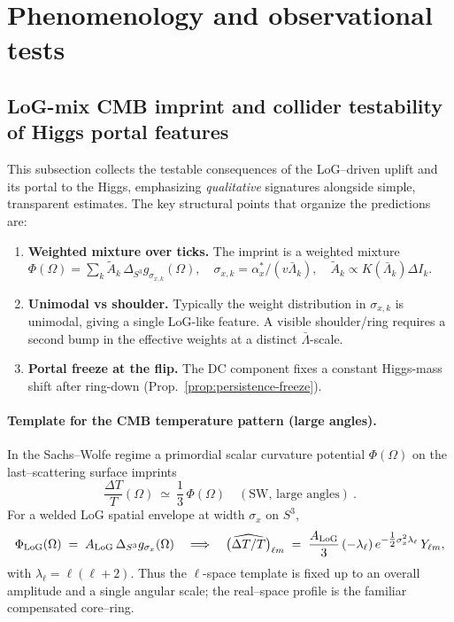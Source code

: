 \documentclass[10pt]{article}
\theoremstyle{definition}
\theoremstyle{plain}
\begin{document}
\section{Phenomenology and observational tests}
\label{sec:phenomenology}

\subsection{LoG-mix CMB imprint and collider testability of Higgs portal features}
\label{subsec:log-mix-imprint}
\label{subsec:higgs-portal}

This subsection collects the testable consequences of the LoG–driven uplift and its
portal to the Higgs, emphasizing \emph{qualitative} signatures alongside simple,
transparent estimates. The key structural points that organize the predictions are:

\begin{enumerate}[label=\textbf{P\arabic*}. ,leftmargin=2.2em,itemsep=2pt]
\item \textbf{Weighted mixture over ticks.} The imprint is a weighted mixture
\(
\Phi(\Omega)=\sum_k \widetilde A_k\,\Delta_{S^3}g_{\sigma_{x,k}}(\Omega),\quad
\sigma_{x,k}=\alpha_x^*/(v\bar\Lambda_k),\quad
\widetilde A_k\propto K(\bar\Lambda_k)\Delta I_k.
\)
\item \textbf{Unimodal vs shoulder.} Typically the weight distribution in \(\sigma_{x,k}\) is unimodal, giving a single LoG-like feature. A visible shoulder/ring requires a second bump in the effective weights at a distinct \(\bar\Lambda\)-scale.
\item \textbf{Portal freeze at the flip.} The DC component fixes a constant Higgs-mass shift after ring-down (Prop.~\ref{prop:persistence-freeze}).
\end{enumerate}

\paragraph{Template for the CMB temperature pattern (large angles).}\label{par:uom-main-160}
In the Sachs–Wolfe regime a primordial scalar curvature potential \(\Phi(\Omega)\) on the last–scattering
surface imprints
\[
\frac{\Delta T}{T}(\Omega)\ \simeq\ \frac{1}{3}\,\Phi(\Omega)\quad
(\text{SW, large angles})\ .
\]
For a welded LoG spatial envelope at width \(\sigma_x\) on \(S^3\),
\[
\Phi_{\rm LoG}(\Omega)\;=\;A_{\rm LoG}\,\Delta_{S^3}g_{\sigma_x}(\Omega)
\quad\Longrightarrow\quad
\big(\widehat{\Delta T/T}\big)_{\ell m}
\;=\;\frac{A_{\rm LoG}}{3}\,(-\lambda_\ell)\,e^{-\tfrac12\sigma_x^2\lambda_\ell}\,Y_{\ell m},
\]
with \(\lambda_\ell=\ell(\ell+2)\). Thus the \(\ell\)-space template is fixed up to an overall amplitude
and a single angular scale; the real–space profile is the familiar compensated core–ring.
\end{document}
